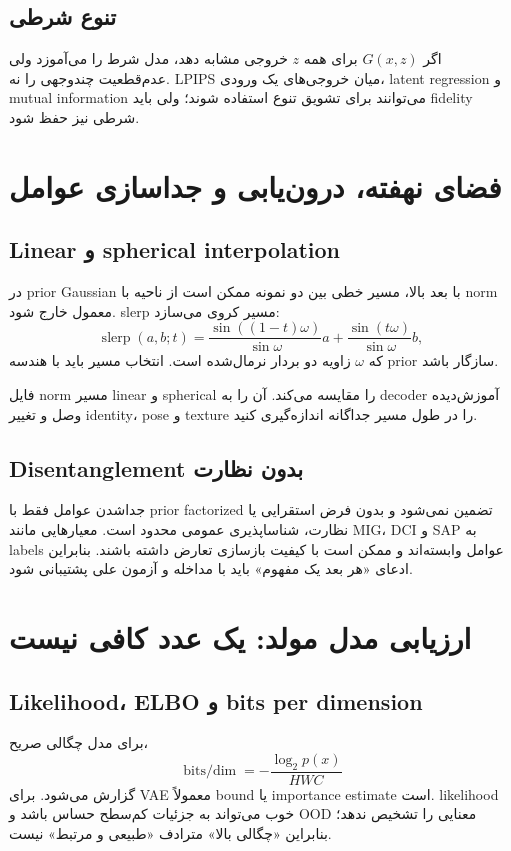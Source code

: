 \documentclass[12pt,openany,oneside]{book}
\begin{document}
\subsection{تنوع شرطی}
اگر $G(x,z)$ برای همه $z$ خروجی مشابه دهد، مدل شرط را می‌آموزد ولی عدم‌قطعیت چندوجهی را نه. LPIPS میان خروجی‌های یک ورودی، latent regression و mutual information می‌توانند برای تشویق تنوع استفاده شوند؛ ولی باید fidelity شرطی نیز حفظ شود.

\section{فضای نهفته، درون‌یابی و جداسازی عوامل}
\subsection{Linear و spherical interpolation}
در prior Gaussian با بعد بالا، مسیر خطی بین دو نمونه ممکن است از ناحیه با norm معمول خارج شود. slerp مسیر کروی می‌سازد:
\begin{equation}
 \operatorname{slerp}(a,b;t)=
 \frac{\sin((1-t)\omega)}{\sin\omega}a+
 \frac{\sin(t\omega)}{\sin\omega}b,
\end{equation}
که $\omega$ زاویه دو بردار نرمال‌شده است. انتخاب مسیر باید با هندسه prior سازگار باشد.

\begin{workshopbox}
فایل  norm مسیر linear و spherical را مقایسه می‌کند. آن را به decoder آموزش‌دیده وصل و تغییر identity، pose و texture را در طول مسیر جداگانه اندازه‌گیری کنید.
\end{workshopbox}

\subsection{Disentanglement بدون نظارت}
جداشدن عوامل فقط با prior factorized تضمین نمی‌شود و بدون فرض استقرایی یا نظارت، شناساپذیری عمومی محدود است. معیارهایی مانند MIG، DCI و SAP به labels عوامل وابسته‌اند و ممکن است با کیفیت بازسازی تعارض داشته باشند. بنابراین ادعای «هر بعد یک مفهوم» باید با مداخله و آزمون علی پشتیبانی شود.

\section{ارزیابی مدل مولد: یک عدد کافی نیست}
\subsection{Likelihood، ELBO و bits per dimension}
برای مدل چگالی صریح،
\begin{equation}
 \operatorname{bits/dim}=-\frac{\log_2 p(x)}{HWC}
\end{equation}
گزارش می‌شود. برای VAE معمولاً bound یا importance estimate است. likelihood خوب می‌تواند به جزئیات کم‌سطح حساس باشد و OOD معنایی را تشخیص ندهد؛ بنابراین «چگالی بالا» مترادف «طبیعی و مرتبط» نیست.
\end{document}
